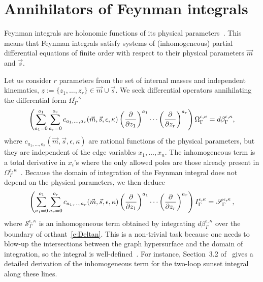 \documentclass[a4paper,12pt]{article}
\numberwithin{equation}{section}
\numberwithin{figure}{section}
\begin{document}
\section{Annihilators of Feynman integrals}
\label{sec:Red}
Feynman integrals are holonomic functions of its physical parameters~\cite{Kashiwara:1977nf, Bitoun:2017nre, Smirnov:2010hn,Lee:2013hzt}. This means that Feynman integrals satisfy systems of  (inhomogeneous) partial
differential equations of finite order with respect to their physical
parameters $\vec m$ and $\vec s$.

Let us consider $r$ parameters from the set of internal masses and independent kinematics, $\underline z:=\{z_1,\dots,z_r\} \in \vec m \cup \vec s $. 
%
We seek 
differential operators 
annihilating the differential form $\Omega_\Gamma^{\epsilon,\kappa}$ 
\begin{equation}\label{e:PFOmegaGeneric}
	\left(  \sum_{a_1=0}^{o_1} \sum_{ a_r=0}^{o_r} c_{a_1,\dots,a_r}(\vec m,\vec s,\epsilon,\kappa)\left(\partial\over \partial z_1\right)^{a_1}\cdots\left(\partial
	\over\partial z_r\right)^{a_r}  \right)\Omega_\Gamma^{\epsilon,\kappa}=d\beta^{\epsilon,\kappa}_\Gamma,
\end{equation}
where $c_{a_1,\dots,a_r}(\vec m,\vec s,\epsilon,\kappa)$ are rational functions of the physical
parameters, but they are independent of the edge variables $x_1,\dots,x_n$. The inhomogeneous term is a total derivative in $x_i$'s where the only allowed poles are those already present in $\Omega_\Gamma^{\epsilon,\kappa}$~\cite{Lairez:2022zkj}.
%
Because the domain of integration of the Feynman integral does not
depend on the physical parameters, we then deduce
\begin{equation}\label{e:PDEintFeynman}
	\left( \sum_{a_1=0}^{o_1} \sum_{ a_r=0}^{o_r} c_{a_1,\dots,a_r}(\vec m,\vec s,\epsilon,\kappa)\left(\partial\over \partial z_1\right)^{a_1}\cdots\left(\partial
	\over\partial z_r\right)^{a_r}  \right)I^{\epsilon,\kappa}_\Gamma=\mathscr{S}^{\epsilon,\kappa}_\Gamma \, ,
\end{equation}
where $\mathscr{S}^{\epsilon,\kappa}_\Gamma$ is an inhomogeneous term obtained by
integrating $d\beta^{\epsilon,\kappa}_\Gamma$ over the boundary of
orthant~\eqref{e:Deltan}. This is a non-trivial task because one needs
to blow-up the intersections between the graph hypersurface and the
domain of integration, so the integral is well-defined~\cite{bek,Brown:2009ta,Bloch:2016izu,muller2014picard}. For
instance, 
Section~3.2 of~\cite{Bloch:2016izu} gives  a detailed derivation of the inhomogeneous term for
the two-loop sunset integral along these lines.
\end{document}
